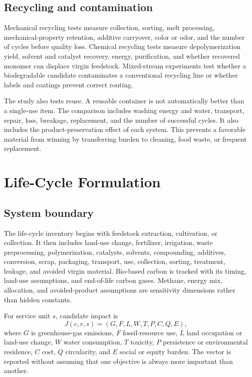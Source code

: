 \documentclass[conference]{IEEEtran}
\begin{document}
\subsection{Recycling and contamination}

Mechanical recycling tests measure collection, sorting, melt processing, mechanical-property retention, additive carryover, color or odor, and the number of cycles before quality loss. Chemical recycling tests measure depolymerization yield, solvent and catalyst recovery, energy, purification, and whether recovered monomer can displace virgin feedstock. Mixed-stream experiments test whether a biodegradable candidate contaminates a conventional recycling line or whether labels and coatings prevent correct routing.

The study also tests reuse. A reusable container is not automatically better than a single-use item. The comparison includes washing energy and water, transport, repair, loss, breakage, replacement, and the number of successful cycles. It also includes the product-preservation effect of each system. This prevents a favorable material from winning by transferring burden to cleaning, food waste, or frequent replacement.

\section{Life-Cycle Formulation}

\subsection{System boundary}

The life-cycle inventory begins with feedstock extraction, cultivation, or collection. It then includes land-use change, fertilizer, irrigation, waste preprocessing, polymerization, catalysts, solvents, compounding, additives, conversion, scrap, packaging, transport, use, collection, sorting, treatment, leakage, and avoided virgin material. Bio-based carbon is tracked with its timing, land-use assumptions, and end-of-life carbon gases. Methane, energy mix, allocation, and avoided-product assumptions are sensitivity dimensions rather than hidden constants.

For service unit $s$, candidate impact is
\begin{equation}
 J(c,r,s)=\left(G,F,L,W,T,P,C,Q,E\right),
 \label{eq:objective}
\end{equation}
where $G$ is greenhouse-gas emissions, $F$ fossil-resource use, $L$ land occupation or land-use change, $W$ water consumption, $T$ toxicity, $P$ persistence or environmental residence, $C$ cost, $Q$ circularity, and $E$ social or equity burden. The vector is reported without assuming that one objective is always more important than another.
\end{document}
